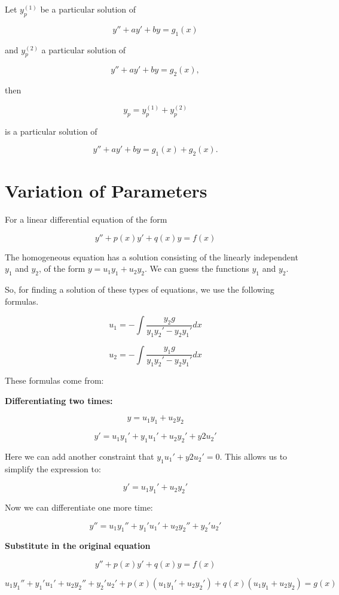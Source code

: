 Let \( y_p^{(1)} \) be a particular solution of

\[
    y'' + ay' + by = g_1(x)
\]

and \( y_p^{(2)} \) a particular solution of

\[
    y'' + ay' + by = g_2(x),
\]

then

\[
    y_p = y_p^{(1)} + y_p^{(2)}
\]

is a particular solution of

\[
    y'' + ay' + by = g_1(x) + g_2(x).
\]

\section{Variation of Parameters}

For a linear differential equation of the form

\[
    y'' + p(x)y' + q(x)y = f(x)
\]

The homogeneous equation has a solution consisting of the linearly independent \(y_1\) and \(y_2\),
of the form \(y = u_1 y_1 + u_2 y_2\). We can guess the functions \(y_1\) and \(y_2\).

So, for finding a solution of these types of equations, we use the following formulas.

\[
    u_1 = - \int \frac{y_2 g}{y_1 y_{2}' - y_2 y_{1}'} dx
\]

\[
    u_2 = - \int \frac{y_1 g}{y_1 y_{2}' - y_2 y_{1}'} dx
\]

These formulas come from:

\textbf{Differentiating two times:}

\[
    y = u_1 y_1 + u_2 y_2
\]

\[
    y' = u_1 y_{1}' + y_1 u_{1}' +  u_2 y_{2}' + y{2} u_{2}'
\]

Here we can add another constraint that \(y_1 u_{1}' + y{2} u_{2}' = 0\). This allows us to
simplify the expression to:

\[
    y' = u_1 y_{1}' +  u_2 y_{2}'
\]

Now we can differentiate one more time:

\[
    y'' =  u_1 y_{1}'' + y_{1}' u_{1}'  + u_2 y_{2}'' + y_{2}' u_{2}'
\]

\textbf{Substitute in the original equation}

\[
    y'' + p(x)y' + q(x)y = f(x)
\]

\[
    u_1 y_{1}'' + y_{1}' u_{1}'  + u_2 y_{2}'' + y_{2}' u_{2}' + p(x)(u_1 y_{1}' +  u_2 y_{2}')
    + q(x)(u_1 y_1 + u_2 y_2) = g(x)
\]

